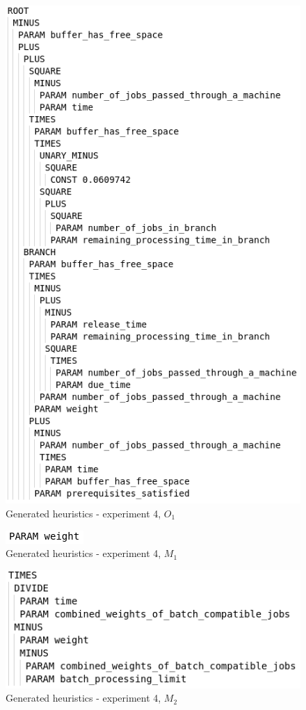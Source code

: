 \begin{figure}[!htbp]
	\centering
	\includegraphics[scale=0.7]{../images/heuristic_01.png}
	\caption{Generated heuristics - experiment 4, $O_1$}
    \label{fig:heuristic_01}
\end{figure}

\begin{figure}[!htbp]
	\centering
	\includegraphics[scale=0.7]{../images/heuristic_02.png}
	\caption{Generated heuristics - experiment 4, $M_1$}
    \label{fig:heuristic_02}
\end{figure}

\begin{figure}[!htbp]
	\centering
	\includegraphics[scale=0.7]{../images/heuristic_03.png}
	\caption{Generated heuristics - experiment 4, $M_2$}
    \label{fig:heuristic_03}
\end{figure}


